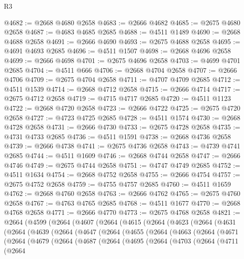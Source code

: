 \begin{lexlean}{R3}
\begin{coremodule}
@4682 := @2668 @4680 @2658
@4683 := @2666 @4682
@4685 := @2675 @4680 @2658
@4687 := @4683 @4685 @2685
@4688 := @4511 @1489
@4690 := @2668 @4688 @2658
@4691 := @2666 @4690
@4693 := @2675 @4688 @2658
@4695 := @4691 @4693 @2685
@4696 := @4511 @1507
@4698 := @2668 @4696 @2658
@4699 := @2666 @4698
@4701 := @2675 @4696 @2658
@4703 := @4699 @4701 @2685
@4704 := @4511 @666
@4706 := @2668 @4704 @2658
@4707 := @2666 @4706
@4709 := @2675 @4704 @2658
@4711 := @4707 @4709 @2685
@4712 := @4511 @1539
@4714 := @2668 @4712 @2658
@4715 := @2666 @4714
@4717 := @2675 @4712 @2658
@4719 := @4715 @4717 @2685
@4720 := @4511 @1123
@4722 := @2668 @4720 @2658
@4723 := @2666 @4722
@4725 := @2675 @4720 @2658
@4727 := @4723 @4725 @2685
@4728 := @4511 @1574
@4730 := @2668 @4728 @2658
@4731 := @2666 @4730
@4733 := @2675 @4728 @2658
@4735 := @4731 @4733 @2685
@4736 := @4511 @1591
@4738 := @2668 @4736 @2658
@4739 := @2666 @4738
@4741 := @2675 @4736 @2658
@4743 := @4739 @4741 @2685
@4744 := @4511 @1609
@4746 := @2668 @4744 @2658
@4747 := @2666 @4746
@4749 := @2675 @4744 @2658
@4751 := @4747 @4749 @2685
@4752 := @4511 @1634
@4754 := @2668 @4752 @2658
@4755 := @2666 @4754
@4757 := @2675 @4752 @2658
@4759 := @4755 @4757 @2685
@4760 := @4511 @1659
@4762 := @2668 @4760 @2658
@4763 := @2666 @4762
@4765 := @2675 @4760 @2658
@4767 := @4763 @4765 @2685
@4768 := @4511 @1677
@4770 := @2668 @4768 @2658
@4771 := @2666 @4770
@4773 := @2675 @4768 @2658
@4821 := @2664
    (@4599
      (@2664
        (@4607
          (@2664
            (@4615
              (@2664
                (@4623
                  (@2664
                    (@4631
                      (@2664
                        (@4639
                          (@2664
                            (@4647
                              (@2664
                                (@4655
                                  (@2664
                                    (@4663
                                      (@2664
                                        (@4671
                                          (@2664
                                            (@4679
                                              (@2664
                                                (@4687
                                                  (@2664
                                                    (@4695
                                                      (@2664
                                                        (@4703
                                                          (@2664
                                                            (@4711
                                                              (@2664

\end{coremodule}
\end{lexlean}
